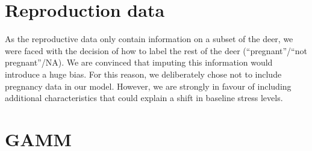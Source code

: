 \documentclass[
  letterpaper,
  DIV=11,
  numbers=noendperiod,
  twocolumn,
  open=any]{scrreprt}
\begin{document}
\section{Reproduction data}\label{sec-feature_selection}

As the reproductive data only contain information on a subset of the
deer, we were faced with the decision of how to label the rest of the
deer (``pregnant''/``not pregnant''/NA). We are convinced that imputing
this information would introduce a huge bias. For this reason, we
deliberately chose not to include pregnancy data in our model. However,
we are strongly in favour of including additional characteristics that
could explain a shift in baseline stress levels.

\section{GAMM}\label{gamm}
\end{document}
